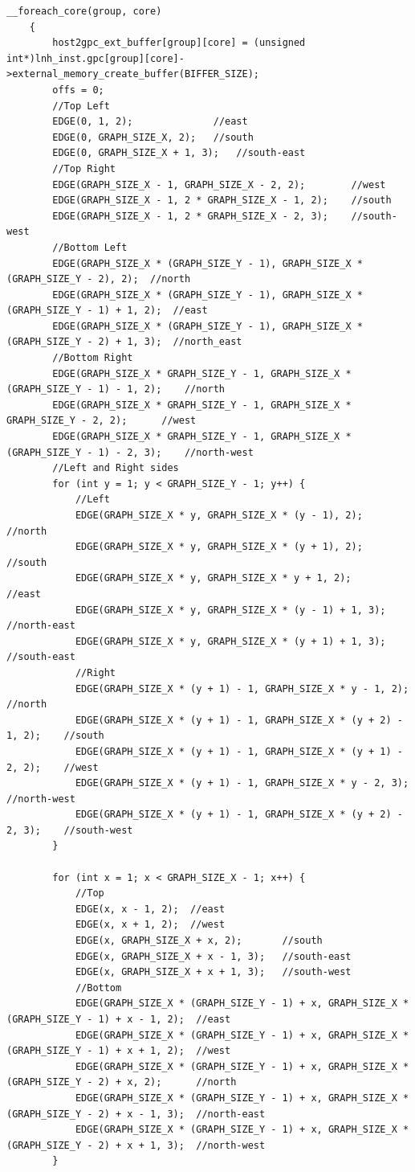 \begin{lstlisting}[label=code, caption=Код чтения из файла]
	__foreach_core(group, core)
	{
		host2gpc_ext_buffer[group][core] = (unsigned int*)lnh_inst.gpc[group][core]->external_memory_create_buffer(BIFFER_SIZE);
		offs = 0;
		//Top Left
		EDGE(0, 1, 2); 				//east
		EDGE(0, GRAPH_SIZE_X, 2); 	//south
		EDGE(0, GRAPH_SIZE_X + 1, 3); 	//south-east
		//Top Right
		EDGE(GRAPH_SIZE_X - 1, GRAPH_SIZE_X - 2, 2); 		//west
		EDGE(GRAPH_SIZE_X - 1, 2 * GRAPH_SIZE_X - 1, 2); 	//south
		EDGE(GRAPH_SIZE_X - 1, 2 * GRAPH_SIZE_X - 2, 3); 	//south-west
		//Bottom Left
		EDGE(GRAPH_SIZE_X * (GRAPH_SIZE_Y - 1), GRAPH_SIZE_X * (GRAPH_SIZE_Y - 2), 2); 	//north
		EDGE(GRAPH_SIZE_X * (GRAPH_SIZE_Y - 1), GRAPH_SIZE_X * (GRAPH_SIZE_Y - 1) + 1, 2);	//east
		EDGE(GRAPH_SIZE_X * (GRAPH_SIZE_Y - 1), GRAPH_SIZE_X * (GRAPH_SIZE_Y - 2) + 1, 3);	//north_east
		//Bottom Right
		EDGE(GRAPH_SIZE_X * GRAPH_SIZE_Y - 1, GRAPH_SIZE_X * (GRAPH_SIZE_Y - 1) - 1, 2); 	//north
		EDGE(GRAPH_SIZE_X * GRAPH_SIZE_Y - 1, GRAPH_SIZE_X * GRAPH_SIZE_Y - 2, 2);		//west
		EDGE(GRAPH_SIZE_X * GRAPH_SIZE_Y - 1, GRAPH_SIZE_X * (GRAPH_SIZE_Y - 1) - 2, 3);	//north-west
		//Left and Right sides
		for (int y = 1; y < GRAPH_SIZE_Y - 1; y++) {
			//Left
			EDGE(GRAPH_SIZE_X * y, GRAPH_SIZE_X * (y - 1), 2); 		//north
			EDGE(GRAPH_SIZE_X * y, GRAPH_SIZE_X * (y + 1), 2);	 	//south
			EDGE(GRAPH_SIZE_X * y, GRAPH_SIZE_X * y + 1, 2); 		//east
			EDGE(GRAPH_SIZE_X * y, GRAPH_SIZE_X * (y - 1) + 1, 3); 	//north-east
			EDGE(GRAPH_SIZE_X * y, GRAPH_SIZE_X * (y + 1) + 1, 3); 	//south-east
			//Right
			EDGE(GRAPH_SIZE_X * (y + 1) - 1, GRAPH_SIZE_X * y - 1, 2); 		//north
			EDGE(GRAPH_SIZE_X * (y + 1) - 1, GRAPH_SIZE_X * (y + 2) - 1, 2); 	//south
			EDGE(GRAPH_SIZE_X * (y + 1) - 1, GRAPH_SIZE_X * (y + 1) - 2, 2); 	//west
			EDGE(GRAPH_SIZE_X * (y + 1) - 1, GRAPH_SIZE_X * y - 2, 3); 		//north-west
			EDGE(GRAPH_SIZE_X * (y + 1) - 1, GRAPH_SIZE_X * (y + 2) - 2, 3); 	//south-west
		}
		
		for (int x = 1; x < GRAPH_SIZE_X - 1; x++) {
			//Top
			EDGE(x, x - 1, 2); 	//east
			EDGE(x, x + 1, 2); 	//west
			EDGE(x, GRAPH_SIZE_X + x, 2); 		//south
			EDGE(x, GRAPH_SIZE_X + x - 1, 3); 	//south-east
			EDGE(x, GRAPH_SIZE_X + x + 1, 3); 	//south-west
			//Bottom
			EDGE(GRAPH_SIZE_X * (GRAPH_SIZE_Y - 1) + x, GRAPH_SIZE_X * (GRAPH_SIZE_Y - 1) + x - 1, 2); 	//east
			EDGE(GRAPH_SIZE_X * (GRAPH_SIZE_Y - 1) + x, GRAPH_SIZE_X * (GRAPH_SIZE_Y - 1) + x + 1, 2); 	//west
			EDGE(GRAPH_SIZE_X * (GRAPH_SIZE_Y - 1) + x, GRAPH_SIZE_X * (GRAPH_SIZE_Y - 2) + x, 2); 		//north
			EDGE(GRAPH_SIZE_X * (GRAPH_SIZE_Y - 1) + x, GRAPH_SIZE_X * (GRAPH_SIZE_Y - 2) + x - 1, 3); 	//north-east
			EDGE(GRAPH_SIZE_X * (GRAPH_SIZE_Y - 1) + x, GRAPH_SIZE_X * (GRAPH_SIZE_Y - 2) + x + 1, 3); 	//north-west
		}
		

\end{lstlisting}
